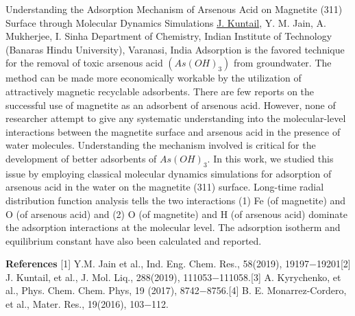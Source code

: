
    \begin{abstract_online}{Understanding the Adsorption Mechanism of Arsenous Acid on Magnetite (311) Surface through Molecular Dynamics Simulations}{%
        \underline{J. Kuntail}, Y. M. Jain, A. Mukherjee, I. Sinha}{%
        }{%
        Department of Chemistry, Indian Institute of Technology (Banaras Hindu University), Varanasi, India }
    Adsorption is the favored technique for the removal of toxic arsenous acid $(As(OH)_3)$ from groundwater. The method can be made more economically workable by the utilization of attractively magnetic recyclable adsorbents. There are few reports on the successful use of magnetite as an adsorbent of arsenous acid. However, none of researcher attempt to give any systematic understanding into the molecular-level interactions between the magnetite surface and arsenous acid in the presence of water molecules. Understanding the mechanism involved is critical for the development of better adsorbents of $As(OH)_3$. In this work, we studied this issue by employing classical molecular dynamics simulations for adsorption of arsenous acid in the water on the magnetite (311) surface. Long-time radial distribution function analysis tells the two interactions (1) Fe (of magnetite) and O (of arsenous acid) and (2) O (of magnetite) and H (of arsenous acid) dominate the adsorption interactions at the molecular level. The adsorption isotherm and equilibrium constant have also been calculated and reported. 
    
        \textbf{References} \newline{}[1] Y.M. Jain et al., Ind. Eng. Chem. Res., 58(2019), 19197−19201\newline{}[2] J. Kuntail, et al., J. Mol. Liq., 288(2019), 111053−111058.\newline{}[3] A. Kyrychenko, et al., Phys. Chem. Chem. Phys, 19 (2017), 8742−8756.\newline{}[4] B. E. Monarrez-Cordero, et al., Mater. Res., 19(2016), 103−112. 
    \end{abstract_online}
    